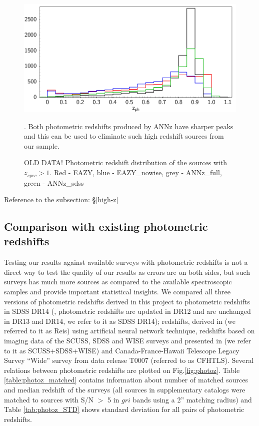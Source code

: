 \documentclass[apj,iop]{emulateapj}
\begin{document}
\begin{figure}
\begin{minipage}{\columnwidth}
\includegraphics[width=\columnwidth,height=0.28\textheight]{figures/hist_highz.png}
\caption{OLD DATA! Photometric redshift distribution of the sources with $z_{spec}>1$. Red - EAZY, blue - EAZY\_nowise, grey - ANNz\_full, green - ANNz\_sdss}. Both photometric redshifts produced by ANNz have sharper peaks and this can be used to eliminate such high redshift sources from our sample.
\label{fig:hist_highz}
\end{minipage}
\end{figure}

Reference to the subsection: \S \ref{high-z}

\subsection{Comparison with existing photometric redshifts}

Testing our results against available surveys with photometric redshifts is not a direct way to test the quality of our results as errors are on both sides, but such surveys has much more sources as compared to the available spectroscopic samples and provide important statistical insights. We compared all three versions of photometric redshifts derived in this project to photometric redshifts in SDSS DR14 (\citet[][]{Beck2016}, photometric redshifts are updated in DR12 and are unchanged in DR13 and DR14, we refer to it as SDSS DR14); redshifts, derived in \citet[][]{Reis2012} (we referred to it as Reis) using artificial neural network technique, redshifts based on imaging data of the SCUSS, SDSS and WISE surveys and presented in \citet[][]{Gao2018} (we refer to it as SCUSS+SDSS+WISE) and Canada-France-Hawaii Telescope Legacy Survey ``Wide'' survey from data release T0007 (referred to as CFHTLS). Several relations between photometric redshifts are plotted on Fig.\ref{fig:photoz}. Table \ref{table:photoz_matched} contains information about number of matched sources and median redshift of the surveys (all sources in supplementary catalogs were matched to sources with S/N $>$ 5 in $gri$ bands using a 2'' matching radius) and Table \ref{tab:photoz_STD} shows standard deviation for all pairs of photometric redshifts.
\end{document}
